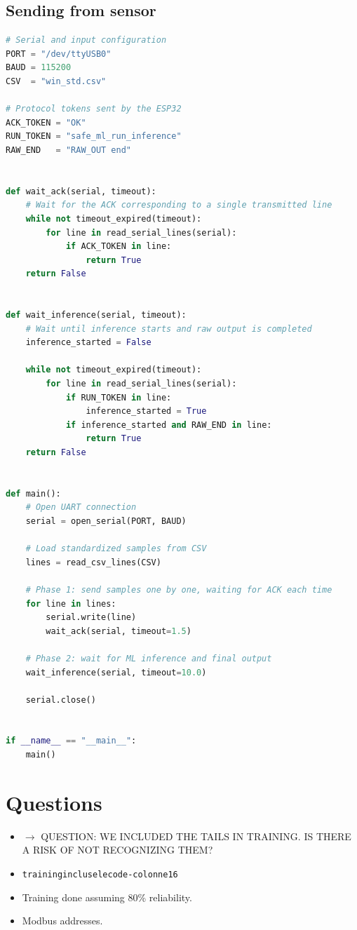 \subsection{Sending from sensor}
\begin{lstlisting}[language=Python]
# Serial and input configuration
PORT = "/dev/ttyUSB0"
BAUD = 115200
CSV  = "win_std.csv"

# Protocol tokens sent by the ESP32
ACK_TOKEN = "OK"
RUN_TOKEN = "safe_ml_run_inference"
RAW_END   = "RAW_OUT end"


def wait_ack(serial, timeout):
    # Wait for the ACK corresponding to a single transmitted line
    while not timeout_expired(timeout):
        for line in read_serial_lines(serial):
            if ACK_TOKEN in line:
                return True
    return False


def wait_inference(serial, timeout):
    # Wait until inference starts and raw output is completed
    inference_started = False

    while not timeout_expired(timeout):
        for line in read_serial_lines(serial):
            if RUN_TOKEN in line:
                inference_started = True
            if inference_started and RAW_END in line:
                return True
    return False


def main():
    # Open UART connection
    serial = open_serial(PORT, BAUD)

    # Load standardized samples from CSV
    lines = read_csv_lines(CSV)

    # Phase 1: send samples one by one, waiting for ACK each time
    for line in lines:
        serial.write(line)
        wait_ack(serial, timeout=1.5)

    # Phase 2: wait for ML inference and final output
    wait_inference(serial, timeout=10.0)

    serial.close()


if __name__ == "__main__":
    main()
\end{lstlisting}

\section{Questions}

\begin{itemize}
    \item[] $\rightarrow$ QUESTION: WE INCLUDED THE TAILS IN TRAINING. IS THERE A RISK OF NOT RECOGNIZING THEM?
    \item[] \texttt{trainingincluselecode-colonne16}
    \item[] Training done assuming 80\% reliability.
    \item[] Modbus addresses.
\end{itemize}

